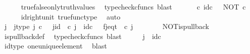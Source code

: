 \begin{isabellebody}
\ \ \ \ \isamarkupfalse%
\ true{\isacharunderscore}{\kern0pt}false{\isacharunderscore}{\kern0pt}only{\isacharunderscore}{\kern0pt}truth{\isacharunderscore}{\kern0pt}values\ \isamarkupfalse%
\ {\isacharparenleft}{\kern0pt}typecheck{\isacharunderscore}{\kern0pt}cfuncs{\isacharcomma}{\kern0pt}\ blast{\isacharparenright}{\kern0pt}\isanewline
\ \ \isamarkupfalse%
\ \isamarkupfalse%
\ {\isachardoublequoteopen}{\isasymt}\ {\isasymcirc}\isactrlsub c\ id\isactrlsub c\ {\isasymone}\ {\isacharequal}{\kern0pt}\ NOT\ {\isasymcirc}\isactrlsub c\ {\isasymt}{\isachardoublequoteclose}\isanewline
\ \ \ \ \isamarkupfalse%
\ id{\isacharunderscore}{\kern0pt}right{\isacharunderscore}{\kern0pt}unit{}\ true{\isacharunderscore}{\kern0pt}func{\isacharunderscore}{\kern0pt}type\ \isamarkupfalse%
\ auto\isanewline
\ \ \isamarkupfalse%
\ \isamarkupfalse%
\ j\ \ j{\isacharunderscore}{\kern0pt}type{\isacharcolon}{\kern0pt}\ {\isachardoublequoteopen}j\ {\isasymin}\isactrlsub c\ {\isasymone}{\isachardoublequoteclose}\ \ j{\isacharunderscore}{\kern0pt}id{\isacharcolon}{\kern0pt}\ {\isachardoublequoteopen}{\isasymbeta}\isactrlbsub {\isasymone}\isactrlesub \ {\isasymcirc}\isactrlsub c\ j\ {\isacharequal}{\kern0pt}\ id\isactrlsub c\ {\isasymone}{\isachardoublequoteclose}\ \ f{\isacharunderscore}{\kern0pt}j{\isacharunderscore}{\kern0pt}eq{\isacharunderscore}{\kern0pt}t{\isacharcolon}{\kern0pt}\ {\isachardoublequoteopen}{\isasymf}\ {\isasymcirc}\isactrlsub c\ j\ {\isacharequal}{\kern0pt}\ {\isasymt}{\isachardoublequoteclose}\isanewline
\ \ \ \ \isamarkupfalse%
\ NOT{\isacharunderscore}{\kern0pt}is{\isacharunderscore}{\kern0pt}pullback\ \isamarkupfalse%
\ is{\isacharunderscore}{\kern0pt}pullback{\isacharunderscore}{\kern0pt}def\ \isamarkupfalse%
\ {\isacharparenleft}{\kern0pt}typecheck{\isacharunderscore}{\kern0pt}cfuncs{\isacharcomma}{\kern0pt}\ blast{\isacharparenright}{\kern0pt}\isanewline
\ \ \isamarkupfalse%
\ \isamarkupfalse%
\ {\isachardoublequoteopen}j\ {\isacharequal}{\kern0pt}\ id\isactrlsub c\ {\isasymone}{\isachardoublequoteclose}\isanewline
\ \ \ \ \isamarkupfalse%
\ id{\isacharunderscore}{\kern0pt}type\ one{\isacharunderscore}{\kern0pt}unique{\isacharunderscore}{\kern0pt}element\ \isamarkupfalse%
\ blast\isanewline
\ \ \isamarkupfalse%
\ \isamarkupfalse%

\end{isabellebody}
